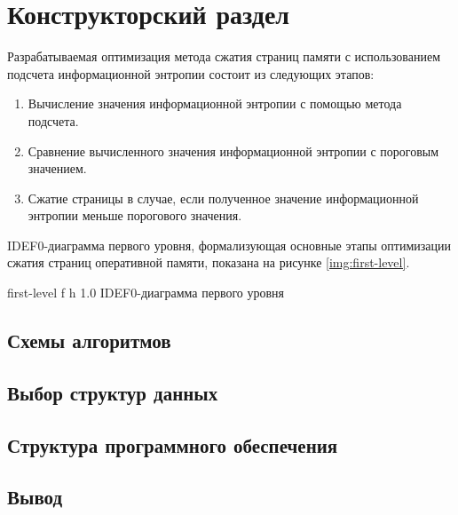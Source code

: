\chapter{Конструкторский раздел}

Разрабатываемая оптимизация метода сжатия страниц памяти с использованием подсчета информационной энтропии состоит из следующих этапов:

\begin{enumerate}
	\item Вычисление значения информационной энтропии с помощью метода подсчета.
	\item Сравнение вычисленного значения информационной энтропии с пороговым значением.
	\item Сжатие страницы в случае, если полученное значение информационной энтропии меньше порогового значения.
\end{enumerate}

IDEF0-диаграмма первого уровня, формализующая основные этапы оптимизации сжатия страниц оперативной памяти, показана на рисунке \ref{img:first-level}.
    
    {first-level}
    {f}
    {h}
    {1.0\textwidth}
    {IDEF0-диаграмма первого уровня}

\section{Схемы алгоритмов}

\section{Выбор структур данных}

\section{Структура программного обеспечения}

\section*{Вывод}

